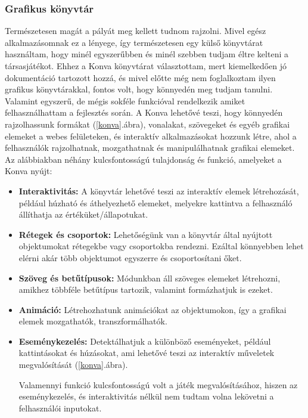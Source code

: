\documentclass[a4paper,twoside]{article}
\begin{document}
\subsubsection{Grafikus könyvtár}
Természetesen magát a pályát meg kellett tudnom rajzolni. Mivel egész alkalmazásomnak ez a lényege, így természetesen egy külső könyvtárat használtam, hogy minél egyszerűbben és minél szebben tudjam éltre kelteni a társasjátékot. Ehhez a Konva\cite{konva} könyvtárat választottam, mert kiemelkedően jó dokumentáció tartozott hozzá, és mivel előtte még nem foglalkoztam ilyen grafikus könyvtárakkal, fontos volt, hogy könnyedén meg tudjam tanulni. Valamint egyszerű, de mégis sokféle funkcióval rendelkezik amiket felhasználhattam a fejlesztés során. 
A Konva lehetővé teszi, hogy könnyedén rajzolhassunk formákat (\ref{konva}.ábra), vonalakat, szövegeket és egyéb grafikai elemeket a webes felületeken, és interaktív alkalmazásokat hozzunk létre, ahol a felhasználók rajzolhatnak, mozgathatnak és manipulálhatnak grafikai elemeket. Az alábbiakban néhány kulcsfontosságú tulajdonság és funkció, amelyeket a Konva nyújt:
\begin{itemize}
	\item \textbf{Interaktivitás:} A könyvtár lehetővé teszi az interaktív elemek létrehozását, például húzható és áthelyezhető elemeket, melyekre kattintva a felhasználó állíthatja az értéküket/állapotukat. 
	\item \textbf{Rétegek és csoportok:} Lehetőségünk van a könyvtár által nyújtott objektumokat rétegekbe vagy csoportokba rendezni. Ezáltal könnyebben lehet elérni akár több objektumot egyszerre és csoportosítani őket.
	\item \textbf{Szöveg és betűtípusok:} Módunkban áll szöveges elemeket létrehozni, amikhez többféle betűtípus tartozik, valamint formázhatjuk is ezeket. 
	\item \textbf{Animáció:} Létrehozhatunk animációkat az objektumokon, így a grafikai elemek mozgathatók, transzformálhatók.
	\item \textbf{Eseménykezelés:} Detektálhatjuk a különböző eseményeket, például kattintásokat és húzásokat, ami lehetővé teszi az interaktív műveletek megvalósítását (\ref{konva}.ábra).
	
	Valamennyi funkció kulcsfontosságú volt a játék megvalósításához, hiszen az eseménykezelés, és interaktivitás nélkül nem tudtam volna lekövetni a felhasználói inputokat.  
\end{itemize}
\end{document}
